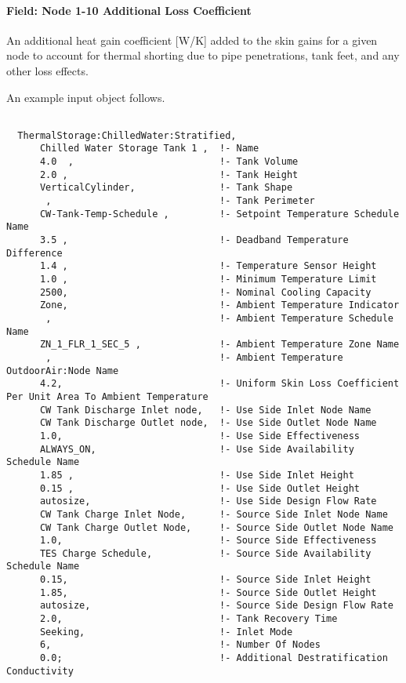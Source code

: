 \paragraph{Field: Node 1-10 Additional Loss Coefficient}\label{field-node-1-10-additional-loss-coefficient}

An additional heat gain coefficient {[}W/K{]} added to the skin gains for a given node to account for thermal shorting due to pipe penetrations, tank feet, and any other loss effects.

An example input object follows.

\begin{lstlisting}

  ThermalStorage:ChilledWater:Stratified,
      Chilled Water Storage Tank 1 ,  !- Name
      4.0  ,                          !- Tank Volume
      2.0 ,                           !- Tank Height
      VerticalCylinder,               !- Tank Shape
       ,                              !- Tank Perimeter
      CW-Tank-Temp-Schedule ,         !- Setpoint Temperature Schedule Name
      3.5 ,                           !- Deadband Temperature Difference
      1.4 ,                           !- Temperature Sensor Height
      1.0 ,                           !- Minimum Temperature Limit
      2500,                           !- Nominal Cooling Capacity
      Zone,                           !- Ambient Temperature Indicator
       ,                              !- Ambient Temperature Schedule Name
      ZN_1_FLR_1_SEC_5 ,              !- Ambient Temperature Zone Name
       ,                              !- Ambient Temperature OutdoorAir:Node Name
      4.2,                            !- Uniform Skin Loss Coefficient Per Unit Area To Ambient Temperature
      CW Tank Discharge Inlet node,   !- Use Side Inlet Node Name
      CW Tank Discharge Outlet node,  !- Use Side Outlet Node Name
      1.0,                            !- Use Side Effectiveness
      ALWAYS_ON,                      !- Use Side Availability Schedule Name
      1.85 ,                          !- Use Side Inlet Height
      0.15 ,                          !- Use Side Outlet Height
      autosize,                       !- Use Side Design Flow Rate
      CW Tank Charge Inlet Node,      !- Source Side Inlet Node Name
      CW Tank Charge Outlet Node,     !- Source Side Outlet Node Name
      1.0,                            !- Source Side Effectiveness
      TES Charge Schedule,            !- Source Side Availability Schedule Name
      0.15,                           !- Source Side Inlet Height
      1.85,                           !- Source Side Outlet Height
      autosize,                       !- Source Side Design Flow Rate
      2.0,                            !- Tank Recovery Time
      Seeking,                        !- Inlet Mode
      6,                              !- Number Of Nodes
      0.0;                            !- Additional Destratification Conductivity
\end{lstlisting}

